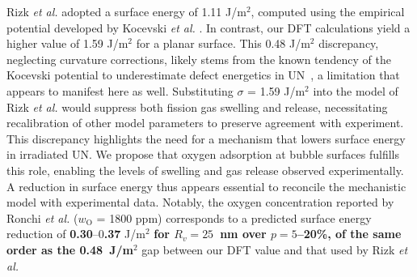 \documentclass[preprint,12pt,sort&compress]{elsarticle}
\newcommand{\?}{\stackrel{?}{=}}
\providecommand{\DIFaddtex}[1]{{\bf #1}} %
\providecommand{\DIFdeltex}[1]{} %
\providecommand{\DIFaddbegin}{\protect\color{blue}} %
\providecommand{\DIFaddend}{\protect\color{black}} %
\providecommand{\DIFdelbegin}{\protect\color{red}} %
\providecommand{\DIFdelend}{\protect\color{black}} %
\providecommand{\DIFadd}[1]{\texorpdfstring{\DIFaddtex{#1}}{#1}} %
\providecommand{\DIFdel}[1]{\texorpdfstring{\DIFdeltex{#1}}{}} %
\begin{document}
Rizk \textit{et al.} adopted a surface energy of 1.11 J/m$^2$, computed using the empirical potential developed by Kocevski \textit{et al.} \cite{Kocevski2022II}. In contrast, our DFT calculations yield a higher value of 1.59 J/m$^2$ for a planar surface. This 0.48 J/m$^2$ discrepancy, neglecting curvature corrections, likely stems from the known tendency of the Kocevski potential to underestimate defect energetics in UN~\cite{AbdulHameed2024}, a limitation that appears to manifest here as well. Substituting $\sigma$ = 1.59 J/m$^2$ into the model of Rizk \textit{et al.} would suppress both fission gas swelling and release, necessitating recalibration of other model parameters to preserve agreement with experiment. This discrepancy highlights the need for a mechanism that lowers surface energy in irradiated UN. We propose that oxygen adsorption at bubble surfaces fulfills this role, enabling the levels of swelling and gas release observed experimentally. A reduction in surface energy thus appears essential to reconcile the mechanistic model with experimental data. Notably, the oxygen concentration reported by Ronchi \textit{et al.} ($w_\text{O}$ = 1800 ppm) corresponds to a predicted surface energy reduction of \DIFdelbegin \DIFdel{0.3}\DIFdelend \DIFaddbegin \DIFadd{0.30}\DIFaddend --0\DIFdelbegin \DIFdel{.4 }\DIFdelend \DIFaddbegin \DIFadd{.37 }\DIFaddend J/m$^2$ \DIFdelbegin \DIFdel{, closely matching the }\DIFdelend \DIFaddbegin \DIFadd{for $R_v=25$~nm over $p=5$--20\%, of the same order as the 0.48~J/m$^2$ }\DIFaddend gap between our DFT value and that used by Rizk \textit{et al.}
\end{document}
